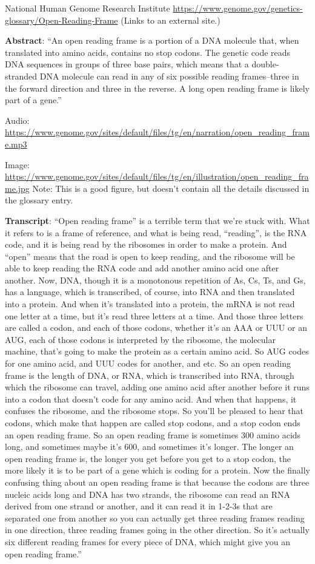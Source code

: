 \documentclass[
]{book}
\begin{document}
National Human Genome Research Institute
\url{https://www.genome.gov/genetics-glossary/Open-Reading-Frame} (Links to an external site.)

\textbf{Abstract}: ``An open reading frame is a portion of a DNA molecule that, when translated into amino acids, contains no stop codons. The genetic code reads DNA sequences in groups of three base pairs, which means that a double-stranded DNA molecule can read in any of six possible reading frames--three in the forward direction and three in the reverse. A long open reading frame is likely part of a gene.''

Audio: \url{https://www.genome.gov/sites/default/files/tg/en/narration/open_reading_frame.mp3}

Image: \url{https://www.genome.gov/sites/default/files/tg/en/illustration/open_reading_frame.jpg}
Note: This is a good figure, but doesn't contain all the details discussed in the glossary entry.

\textbf{Transcript}: ``Open reading frame'' is a terrible term that we're stuck with. What it refers to is a frame of reference, and what is being read, ``reading'', is the RNA code, and it is being read by the ribosomes in order to make a protein. And ``open'' means that the road is open to keep reading, and the ribosome will be able to keep reading the RNA code and add another amino acid one after another. Now, DNA, though it is a monotonous repetition of As, Cs, Ts, and Gs, has a language, which is transcribed, of course, into RNA and then translated into a protein. And when it's translated into a protein, the mRNA is not read one letter at a time, but it's read three letters at a time. And those three letters are called a codon, and each of those codons, whether it's an AAA or UUU or an AUG, each of those codons is interpreted by the ribosome, the molecular machine, that's going to make the protein as a certain amino acid. So AUG codes for one amino acid, and UUU codes for another, and etc. So an open reading frame is the length of DNA, or RNA, which is transcribed into RNA, through which the ribosome can travel, adding one amino acid after another before it runs into a codon that doesn't code for any amino acid. And when that happens, it confuses the ribosome, and the ribosome stops. So you'll be pleased to hear that codons, which make that happen are called stop codons, and a stop codon ends an open reading frame. So an open reading frame is sometimes 300 amino acids long, and sometimes maybe it's 600, and sometimes it's longer. The longer an open reading frame is, the longer you get before you get to a stop codon, the more likely it is to be part of a gene which is coding for a protein. Now the finally confusing thing about an open reading frame is that because the codons are three nucleic acids long and DNA has two strands, the ribosome can read an RNA derived from one strand or another, and it can read it in 1-2-3s that are separated one from another so you can actually get three reading frames reading in one direction, three reading frames going in the other direction. So it's actually six different reading frames for every piece of DNA, which might give you an open reading frame.''
\end{document}
